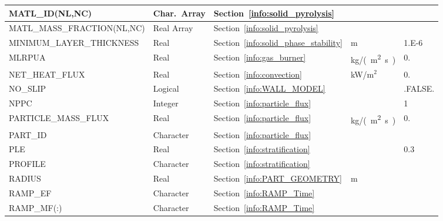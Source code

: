 \documentclass[11pt]{book}
\begin{document}
\begin{longtable}{@{\extracolsep{\fill}}|l|l|l|l|l|}
{\ct MATL\_ID(NL,NC)}                 & Char.~Array     & Section~\ref{info:solid_pyrolysis}        &                     &                         \\ \hline
{\ct MATL\_MASS\_FRACTION(NL,NC)}     & Real Array      & Section~\ref{info:solid_pyrolysis}        &                     &                         \\ \hline
{\ct MINIMUM\_LAYER\_THICKNESS}       & Real            & Section~\ref{info:solid_phase_stability}  & m                   & 1.E-6                   \\ \hline
{\ct MLRPUA }                         & Real            & Section~\ref{info:gas_burner}             & \si{kg/(m^2.s)}     & 0.                      \\ \hline
{\ct NET\_HEAT\_FLUX}                 & Real            & Section~\ref{info:convection}             & kW/m$^2$            & 0.                      \\ \hline
{\ct NO\_SLIP}                        & Logical         & Section~\ref{info:WALL_MODEL}             &                     & {\ct .FALSE.}           \\ \hline
{\ct NPPC}                            & Integer         & Section~\ref{info:particle_flux}          &                     & 1                       \\ \hline
{\ct PARTICLE\_MASS\_FLUX}            & Real            & Section~\ref{info:particle_flux}          & \si{kg/(m^2.s)}     & 0.                      \\ \hline
{\ct PART\_ID}                        & Character       & Section~\ref{info:particle_flux}          &                     &                         \\ \hline
{\ct PLE}                             & Real            & Section~\ref{info:stratification}         &                     & 0.3                     \\ \hline
{\ct PROFILE}                         & Character       & Section~\ref{info:stratification}         &                     &                         \\ \hline
{\ct RADIUS}                          & Real            & Section~\ref{info:PART_GEOMETRY}          & m                   &                         \\ \hline
{\ct RAMP\_EF}                        & Character       & Section~\ref{info:RAMP_Time}              &                     &                         \\ \hline
{\ct RAMP\_MF(:)}                     & Character       & Section~\ref{info:RAMP_Time}              &                     &                         \\ \hline

\end{longtable}
\end{document}

